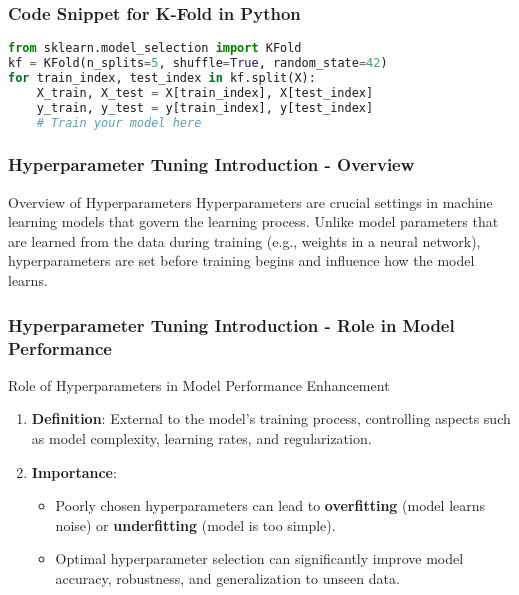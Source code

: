 \documentclass{beamer}
\begin{document}
\begin{frame}[fragile]
    \frametitle{Code Snippet for K-Fold in Python}
    \begin{lstlisting}[language=Python]
from sklearn.model_selection import KFold
kf = KFold(n_splits=5, shuffle=True, random_state=42)
for train_index, test_index in kf.split(X):
    X_train, X_test = X[train_index], X[test_index]
    y_train, y_test = y[train_index], y[test_index]
    # Train your model here
    \end{lstlisting}
\end{frame}

\begin{frame}[fragile]
    \frametitle{Hyperparameter Tuning Introduction - Overview}
    \begin{block}{Overview of Hyperparameters}
        Hyperparameters are crucial settings in machine learning models that govern the learning process. Unlike model parameters that are learned from the data during training (e.g., weights in a neural network), hyperparameters are set before training begins and influence how the model learns.
    \end{block}
\end{frame}

\begin{frame}[fragile]
    \frametitle{Hyperparameter Tuning Introduction - Role in Model Performance}
    \begin{block}{Role of Hyperparameters in Model Performance Enhancement}
        \begin{enumerate}
            \item \textbf{Definition}: External to the model's training process, controlling aspects such as model complexity, learning rates, and regularization.
            \item \textbf{Importance}:
            \begin{itemize}
                \item Poorly chosen hyperparameters can lead to \textbf{overfitting} (model learns noise) or \textbf{underfitting} (model is too simple).
                \item Optimal hyperparameter selection can significantly improve model accuracy, robustness, and generalization to unseen data.
            \end{itemize}
        \end{enumerate}
    \end{block}
\end{frame}
\end{document}
